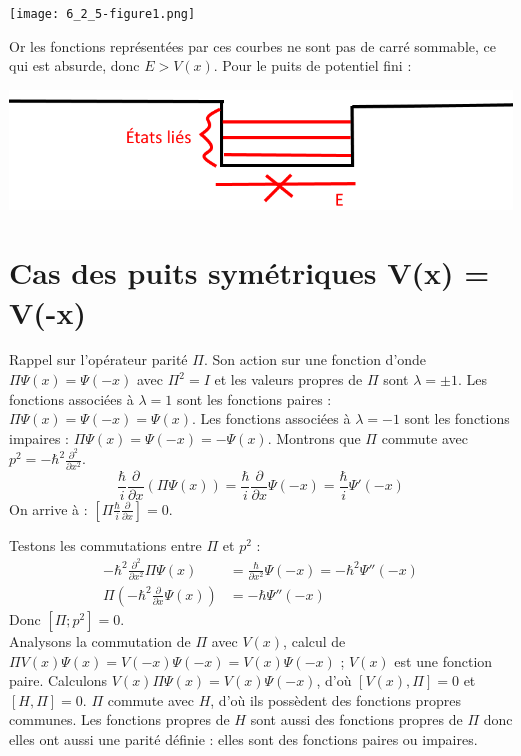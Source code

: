 \documentclass[12pt,a4paper,titlepage]{book}
\begin{document}
\begin{center}
\texttt{[image: 6\_2\_5-figure1.png]}
\end{center}

Or les fonctions représentées par ces courbes ne sont pas de carré sommable, ce qui est absurde, donc $E > V(x)$. Pour le puits de potentiel fini :

\begin{center}
\includegraphics[scale=0.4]{6-2-5-figure2-ok.png}
\end{center}

\section{Cas des puits symétriques V(x) = V(-x)}

Rappel sur l'opérateur parité $\Pi$. Son action sur une fonction d'onde $\Pi \Psi (x) = \Psi (-x)$ avec $\Pi^2 = I$ et les valeurs propres de $\Pi$ sont $\lambda = \pm 1$. Les fonctions associées à $\lambda = 1$ sont les fonctions paires : $\Pi \Psi (x) = \Psi (-x) = \Psi (x)$. Les fonctions associées à $\lambda = -1$ sont les fonctions impaires : $\Pi \Psi (x) = \Psi (-x) = -\Psi (x)$. Montrons que $\Pi$ commute avec $p^2 = -\hbar^2 \frac{\partial^2}{\partial x^2}$.
\begin{equation*}
\frac{\hbar}{i} \frac{\partial}{\partial x} \left( \Pi \Psi (x) \right) = \frac{\hbar}{i} \frac{\partial}{\partial x} \Psi (-x) = \frac{\hbar}{i} \Psi' (-x)
\end{equation*}
On arrive à : $\left[ \Pi \frac{\hbar}{i} \frac{\partial}{\partial x} \right] = 0$.

Testons les commutations entre $\Pi$ et $p^2$ :
\begin{align*}
- \hbar^2 \frac{\partial^2}{\partial x^2} \Pi \Psi (x) &= \frac{\hbar}{\partial x^2} \Psi (-x) = -\hbar^2 \Psi'' (-x)\\
\Pi \left( -\hbar^2 \frac{\partial}{\partial x} \Psi (x) \right) &= -\hbar \Psi'' (-x)
\end{align*}
Donc $[\Pi ; p^2] = 0$.\\

Analysons la commutation de $\Pi$ avec $V(x)$, calcul de $\Pi V(x) \Psi (x) = V(-x) \Psi (-x) = V(x) \Psi (-x)$ ; $V(x)$ est une fonction paire. Calculons $V(x) \Pi \Psi (x) = V(x) \Psi (-x)$, d'où $[V(x) , \Pi] = 0$ et $[H , \Pi] = 0$. $\Pi$ commute avec $H$, d'où ils possèdent des fonctions propres communes. Les fonctions propres de $H$ sont aussi des fonctions propres de $\Pi$ donc elles ont aussi une parité définie : elles sont des fonctions paires ou impaires.
\end{document}
